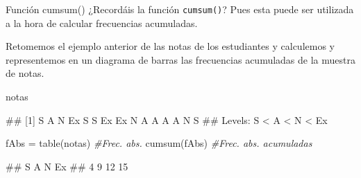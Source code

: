 \documentclass[
  ignorenonframetext,
  aspectratio=169]{beamer}
\newenvironment{Shaded}{\begin{snugshade}}{\end{snugshade}}
\newcommand{\CommentTok}[1]{\textcolor[rgb]{0.56,0.35,0.01}{\textit{#1}}}
\newcommand{\FunctionTok}[1]{\textcolor[rgb]{0.00,0.00,0.00}{#1}}
\newcommand{\NormalTok}[1]{#1}
\newcommand{\OtherTok}[1]{\textcolor[rgb]{0.56,0.35,0.01}{#1}}
\let\oldverbatim\verbatim
\let\endoldverbatim\endverbatim
\renewenvironment{verbatim}{\tiny\oldverbatim}{\endoldverbatim}
\begin{document}
\begin{frame}[fragile]{Función cumsum()}
\protect\hypertarget{funciuxf3n-cumsum}{}
¿Recordáis la función \texttt{cumsum()}? Pues esta puede ser utilizada a
la hora de calcular frecuencias acumuladas.

Retomemos el ejemplo anterior de las notas de los estudiantes y
calculemos y representemos en un diagrama de barras las frecuencias
acumuladas de la muestra de notas.

\begin{Shaded}
\begin{Highlighting}[]
\NormalTok{notas}
\end{Highlighting}
\end{Shaded}

\begin{verbatim}
##  [1] S  A  N  Ex S  S  Ex Ex N  A  A  A  A  N  S 
## Levels: S < A < N < Ex
\end{verbatim}

\begin{Shaded}
\begin{Highlighting}[]
\NormalTok{fAbs }\OtherTok{=} \FunctionTok{table}\NormalTok{(notas) }\CommentTok{\#Frec. abs.}
\FunctionTok{cumsum}\NormalTok{(fAbs) }\CommentTok{\#Frec. abs. acumuladas}
\end{Highlighting}
\end{Shaded}

\begin{verbatim}
##  S  A  N Ex 
##  4  9 12 15
\end{verbatim}
\end{frame}
\end{document}
